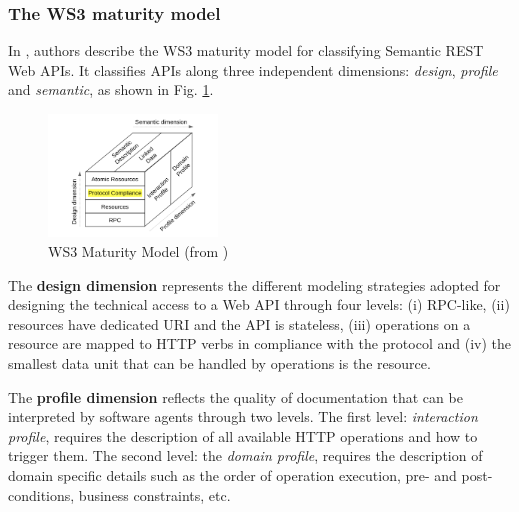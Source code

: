\vspace*{-0.5cm}

\subsubsection{The WS3 maturity model}

In \cite{7195633}, authors describe the WS3 maturity model for classifying Semantic REST Web APIs. 
It classifies APIs along three independent dimensions: \textit{design}, \textit{profile} and \textit{semantic}, as shown in Fig. \ref{WS3}.

\begin{figure}
\vspace{-0.9cm}
\caption{ WS3 Maturity Model (from \cite{7195633})}
  \begin{center}
    \includegraphics[width=0.4\textwidth]{figures/ws3-maturity-model.png}
  \end{center}
  \label{WS3}
  \vspace{-0.9cm}
\end{figure}

The \textbf{design dimension} represents the different modeling strategies adopted for designing the technical access to a Web API through four levels:
(i) RPC-like, (ii) resources have dedicated URI and the API is stateless, (iii) operations on a resource are mapped to HTTP verbs in compliance with the protocol and (iv) the smallest data unit that can be handled by operations is the resource.

The \textbf{profile dimension} reflects the quality of documentation that can be interpreted by software agents through two levels. The first level: \textit{interaction profile}, requires the description of all available HTTP operations and how to trigger them. The second level: the \textit{domain profile}, requires the description of domain specific details such as the order of operation execution, pre- and post-conditions, business constraints, etc.

